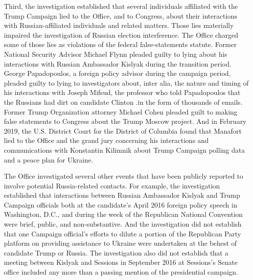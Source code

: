 Third, the investigation established that several individuals affiliated with the Trump Campaign lied to the Office, and to Congress, about their interactions with Russian-affiliated individuals and related matters.
Those lies materially impaired the investigation of Russian election interference.
The Office charged some of those lies as violations of the federal false-statements statute.
Former National Security Advisor Michael Flynn pleaded guilty to lying about his interactions with Russian Ambassador Kislyak during the transition period.
George Papadopoulos, a foreign policy advisor during the campaign period, pleaded guilty to lying to investigators about, inter alia, the nature and timing of his interactions with Joseph Mifsud, the professor who told Papadopoulos that the Russians had dirt on candidate Clinton .in the form of thousands of emails.
Former Trump Organization attorney Michael Cohen pleaded guilt to making false statements to Congress about the Trump Moscow project.
And in February 2019, the U.S. District Court for the District of Columbia found that Manafort lied to the Office and the grand jury concerning his interactions and communications with Konstantin Kilimnik about Trump Campaign polling data and a peace plan for Ukraine.

\hr

The Office investigated several other events that have been publicly reported to involve potential Russia-related contacts.
For example, the investigation established that interactions between Russian Ambassador Kislyak and Trump Campaign officials both at the candidate's April 2016 foreign policy speech in Washington, D.C., and during the week of the Republican National Convention were brief, public, and non-substantive.
And the investigation did not establish that one Campaign official's efforts to dilute a portion of the Republican Party platform on providing assistance to Ukraine were undertaken at the behest of candidate Trump or Russia.
The investigation also did not establish that a meeting between Kislyak and Sessions in September 2016 at Sessions's Senate office included any more than a passing mention of the presidential campaign.

